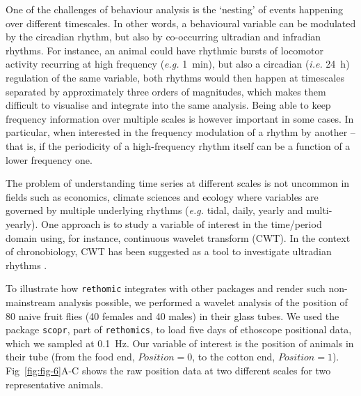 \documentclass[10pt,letterpaper]{article}\usepackage[]{graphicx}\usepackage[]{color}
\begin{document}
One of the challenges of behaviour analysis is the `nesting' of events happening over different timescales.
In other words, a behavioural variable can be modulated by the circadian rhythm, but also by co-occurring ultradian and infradian rhythms.
For instance, an animal could have rhythmic bursts of locomotor activity recurring at high frequency (\emph{e.g.} 1~min), but also a circadian (\emph{i.e.} 24~h) regulation of the same variable,
both rhythms would then happen at timescales separated by approximately three orders of magnitudes, which makes them difficult to visualise and integrate into the same analysis.
Being able to keep frequency information over multiple scales is however important in some cases.
In particular, when interested in the frequency modulation of a rhythm by another --
that is, if the periodicity of a high-frequency rhythm itself can be a function of a lower frequency one.

The problem of understanding time series at different scales is not uncommon in fields such as economics\cite{aguiar-conraria_business_2011}, climate sciences\cite{lau_climate_1995} and ecology\cite{cazelles_wavelet_2008} where variables are governed by multiple underlying rhythms (\emph{e.g.} tidal, daily, yearly and multi-yearly).
One approach is to study a variable of interest in the time/period domain using, for instance, continuous wavelet transform (CWT)\cite{grossmann_decomposition_1984}.
In the context of chronobiology, CWT has been suggested as a tool to investigate ultradian rhythms \cite{leise_wavelet_2013}.

To illustrate how \texttt{rethomic} integrates with other packages and render such non-mainstream analysis possible,
we performed a wavelet analysis of the position of 80 naive fruit flies (40 females and 40 males) in their glass tubes.
We used the package \texttt{scopr}, part of \texttt{rethomics}, to load five days of ethoscope positional data, which we sampled at 0.1~Hz.
Our variable of interest is the position of animals in their tube (from the food end, $Position = 0$,  to the cotton end, $Position = 1$).
Fig~\ref{fig:fig-6}A-C shows the raw position data at two different scales for two representative animals.
\end{document}
